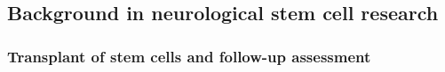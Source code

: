 \subsection{Background in neurological stem cell  research}

\subsubsection{Transplant of stem cells and follow-up assessment}